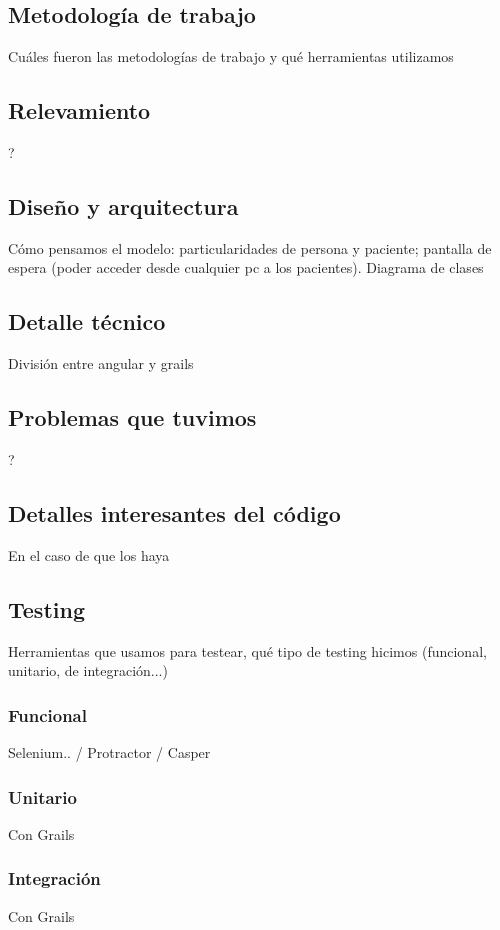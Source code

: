 \documentclass[a4paper,10pt]{article}
\begin{document}
\subsection{Metodología de trabajo}
Cuáles fueron las metodologías de trabajo y qué herramientas utilizamos

\subsection{Relevamiento}
?

\subsection{Diseño y arquitectura}
Cómo pensamos el modelo: particularidades de persona y paciente; pantalla de espera (poder acceder desde cualquier pc a los pacientes).
Diagrama de clases 

\subsection{Detalle técnico}
División entre angular y grails

\subsection{Problemas que tuvimos}
?

\subsection{Detalles interesantes del código}
En el caso de que los haya 




\subsection{Testing}
Herramientas que usamos para testear, qué tipo de testing hicimos (funcional, unitario, de integración...)
\subsubsection{Funcional}
Selenium.. / Protractor / Casper
\subsubsection{Unitario}
Con Grails
\subsubsection{Integración}
Con Grails
\end{document}
